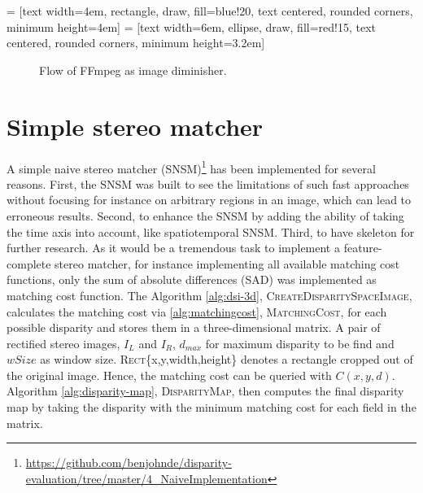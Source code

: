 = [text width=4em, rectangle, draw, fill=blue!20, text centered, rounded corners, minimum height=4em]
 = [text width=6em, ellipse, draw, fill=red!15, text centered, rounded corners, minimum height=3.2em]
\begin{figure}[h!]
  \vspace{1cm}
  \centering
  \caption{Flow of FFmpeg as image diminisher.}
  \label{fig:ffmpeg-flow}
\end{figure}

\section{Simple stereo matcher}

A simple naive stereo matcher (SNSM)\footnote{\url{https://github.com/benjohnde/disparity-evaluation/tree/master/4_NaiveImplementation}} has been implemented for several reasons.
First, the SNSM was built to see the limitations of such fast approaches without focusing for instance on arbitrary regions in an image, which can lead to erroneous results.
Second, to enhance the SNSM by adding the ability of taking the time axis into account, like spatiotemporal SNSM.
Third, to have skeleton for further research.
As it would be a tremendous task to implement a feature-complete stereo matcher, for instance implementing all available matching cost functions, only the sum of absolute differences (SAD) was implemented as matching cost function.
\newline\newline\noindent The Algorithm \ref{alg:dsi-3d}, \textsc{CreateDisparitySpaceImage}, calculates the matching cost via \ref{alg:matchingcost}, \textsc{MatchingCost}, for each possible disparity and stores them in a three-dimensional matrix.
A pair of rectified stereo images, $I_L$ and $I_R$, $d_{max}$ for maximum disparity to be find and $wSize$ as window size.
\textsc{Rect}\{x,y,width,height\} denotes a rectangle cropped out of the original image.
Hence, the matching cost can be queried with $C(x,y,d)$.
Algorithm \ref{alg:disparity-map}, \textsc{DisparityMap}, then computes the final disparity map by taking the disparity with the minimum matching cost for each field in the matrix.

